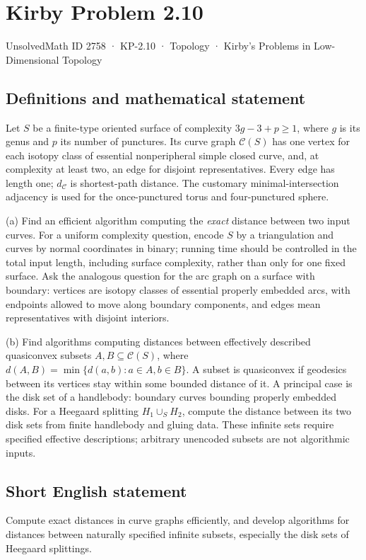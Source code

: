 \documentclass[11pt,a4paper]{article}
\begin{document}
\section*{Kirby Problem 2.10}\label{2758}
{\small UnsolvedMath ID 2758 · KP-2.10 · Topology · Kirby's Problems in Low-Dimensional Topology}
\subsection{Definitions and mathematical statement}
Let $S$ be a finite-type oriented surface of complexity $3g-3+p\geq1$, where
$g$ is its genus and $p$ its number of punctures. Its curve graph $\mathcal C(S)$
has one vertex for each isotopy class of essential nonperipheral simple closed
curve, and, at complexity at least two, an edge for disjoint representatives. Every edge
has length one; $d_{\mathcal C}$ is shortest-path distance. The customary
minimal-intersection adjacency is used for the once-punctured torus and
four-punctured sphere.

(a) Find an efficient algorithm computing the \emph{exact} distance between two
input curves. For a uniform complexity question, encode $S$ by a triangulation
and curves by normal coordinates in binary; running time should be controlled
in the total input length, including surface complexity, rather than only for
one fixed surface.
Ask the analogous question for the arc graph on a surface with boundary:
vertices are isotopy classes of essential properly embedded arcs, with
endpoints allowed to move along boundary components, and edges mean
representatives with disjoint interiors.

(b) Find algorithms computing distances between effectively described
quasiconvex subsets $A,B\subseteq\mathcal C(S)$, where
$d(A,B)=\min\{d(a,b):a\in A,b\in B\}$.
A subset is quasiconvex if geodesics between its vertices stay within some
bounded distance of it. A principal case is the disk set of a handlebody:
boundary curves bounding properly embedded disks. For a Heegaard splitting
$H_1\cup_S H_2$, compute the distance between its two disk sets from finite
handlebody and gluing data. These infinite sets require specified effective
descriptions; arbitrary unencoded subsets are not algorithmic inputs.
\subsection{Short English statement}
Compute exact distances in curve graphs efficiently, and develop algorithms for distances between naturally specified infinite subsets, especially the disk sets of Heegaard splittings.
\end{document}
